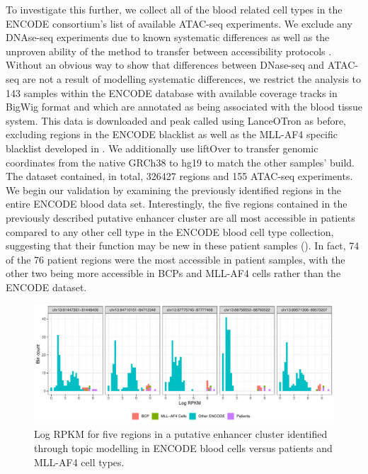 To investigate this further, we collect all of the blood related cell types in the ENCODE consortium's list of available ATAC-seq experiments. We exclude any DNAse-seq experiments due to known systematic differences as well as the unproven ability of the method to transfer between accessibility protocols \cite{Klemm2019a}. Without an obvious way to show that differences between DNase-seq and ATAC-seq are not a result of modelling systematic differences, we restrict the analysis to 143 samples within the ENCODE database with available coverage tracks in BigWig format and which are annotated as being associated with the blood tissue system. This data is downloaded and peak called using LanceOTron as before, excluding regions in the ENCODE blacklist as well as the MLL-AF4 specific blacklist developed in . We additionally use liftOver to transfer genomic coordinates from the native GRCh38 to hg19 to match the other samples' build. The dataset contained, in total, 326427 regions and 155 ATAC-seq experiments. We begin our validation by examining the previously identified regions in the entire ENCODE blood data set. Interestingly, the five regions contained in the previously described putative enhancer cluster are all most accessible in patients compared to any other cell type in the ENCODE blood cell type collection, suggesting that their function may be new in these patient samples (). In fact, 74 of the 76 patient regions were the most accessible in patient samples, with the other two being more accessible in BCPs and MLL-AF4 cells rather than the ENCODE dataset.

\begin{figure}
    \centering
    \includegraphics[width=\textwidth]{plot/ch5/pt_compared_to_encode.pdf}
    \caption{Log RPKM for five regions in a putative enhancer cluster identified through topic modelling in ENCODE blood cells versus patients and MLL-AF4 cell types.}
    \label{fig:encode_pt_regions}
\end{figure}

